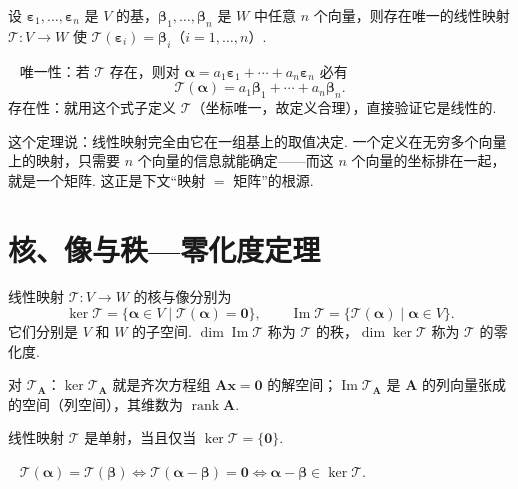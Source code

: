 \documentclass[lang=cn,10.5pt,scheme=chinese,toc=twocol,section,chinesefont=nofont,
twoside,citestyle=gb7714-2015,bibstyle=gb7714-2015]{elegantbook}
\DeclareRobustCommand{\textbf}[1]{{\lnsemiboldlatin\lnsemiboldcjk #1}}
\newcommand{\vv}[1]{\boldsymbol{#1}}
\newcommand{\zero}{\boldsymbol{0}}          %
\numberwithin{equation}{section}   %
\newcommand{\rk}{\operatorname{rank}}       %
\newcommand{\imm}{\operatorname{Im}}        %
\newcommand*{\lnlabel}[1]{{\sffamily\bfseries\color{black}#1}}
\renewenvironment{proof}{%
	\par\noindent\lnlabel{\proofname}\;\ \color{black!90}\cfs}{\par}
\begin{document}
\begin{theorem}
  \label{thm:determinedbybasis}
  设 $\vv\varepsilon_1,\ldots,\vv\varepsilon_n$ 是 $V$ 的基，$\vv\beta_1,\ldots,\vv\beta_n$ 是 $W$ 中任意 $n$ 个向量，则存在唯一的线性映射 $\mathscr T:V\to W$ 使 $\mathscr T(\vv\varepsilon_i)=\vv\beta_i$（$i=1,\ldots,n$）.
\end{theorem}
\begin{proof}
  唯一性：若 $\mathscr T$ 存在，则对 $\vv\alpha=a_1\vv\varepsilon_1+\cdots+a_n\vv\varepsilon_n$ 必有
  \[\mathscr T(\vv\alpha)=a_1\vv\beta_1+\cdots+a_n\vv\beta_n.\]
  存在性：就用这个式子定义 $\mathscr T$（坐标唯一，故定义合理），直接验证它是线性的.
\end{proof}

\begin{motivebox}
  这个定理说：\textbf{线性映射完全由它在一组基上的取值决定}. 一个定义在无穷多个向量上的映射，只需要 $n$ 个向量的信息就能确定——而这 $n$ 个向量的坐标排在一起，就是一个矩阵. 这正是下文“映射 $=$ 矩阵”的根源.
\end{motivebox}

\section{核、像与秩—零化度定理}

\begin{definition}
  线性映射 $\mathscr T:V\to W$ 的\textbf{核}与\textbf{像}分别为
  \[
    \ker\mathscr T=\{\vv\alpha\in V\mid\mathscr T(\vv\alpha)=\zero\},\qquad \imm\mathscr T=\{\mathscr T(\vv\alpha)\mid\vv\alpha\in V\}.
  \]
  它们分别是 $V$ 和 $W$ 的子空间. $\dim\imm\mathscr T$ 称为 $\mathscr T$ 的\textbf{秩}，$\dim\ker\mathscr T$ 称为 $\mathscr T$ 的\textbf{零化度}.
\end{definition}

对 $\mathscr T_{\vv A}$：$\ker\mathscr T_{\vv A}$ 就是齐次方程组 $\vv{Ax}=\zero$ 的解空间；$\imm\mathscr T_{\vv A}$ 是 $\vv A$ 的列向量张成的空间（\textbf{列空间}），其维数为 $\rk\vv A$.

\begin{proposition}
  线性映射 $\mathscr T$ 是单射，当且仅当 $\ker\mathscr T=\{\zero\}$.
\end{proposition}
\begin{proof}
  $\mathscr T(\vv\alpha)=\mathscr T(\vv\beta)\iff\mathscr T(\vv\alpha-\vv\beta)=\zero\iff\vv\alpha-\vv\beta\in\ker\mathscr T$.
\end{proof}
\end{document}

